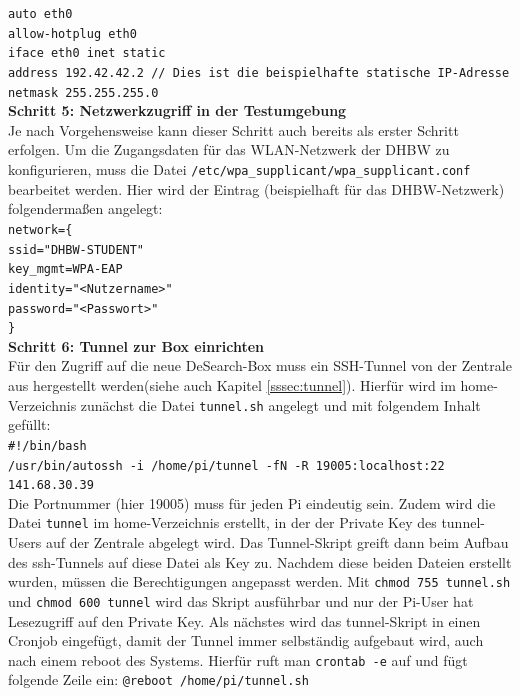 \texttt{auto eth0\\
	allow-hotplug eth0\\
	iface eth0 inet static\\
	address 192.42.42.2 // Dies ist die beispielhafte statische IP-Adresse\\
	netmask 255.255.255.0}\\
\textbf{Schritt 5: Netzwerkzugriff in der Testumgebung}\\
Je nach Vorgehensweise kann dieser Schritt auch bereits als erster Schritt erfolgen. Um die Zugangsdaten für das WLAN-Netzwerk der DHBW zu konfigurieren, muss die Datei \texttt{/etc/wpa\_supplicant/wpa\_supplicant.conf} bearbeitet werden. Hier wird der Eintrag (beispielhaft für das DHBW-Netzwerk) folgendermaßen angelegt:\\
\texttt{network=\{\\
	\tab ssid="DHBW-STUDENT"\\
	\tab key\_mgmt=WPA-EAP\\
	\tab identity="<Nutzername>"\\
	\tab password="<Passwort>"\\
	\}}\\
\textbf{Schritt 6: Tunnel zur Box einrichten}\\
Für den Zugriff auf die neue DeSearch-Box muss ein SSH-Tunnel von der Zentrale aus hergestellt werden(siehe auch Kapitel \ref{sssec:tunnel}). Hierfür wird im home-Verzeichnis zunächst die Datei \texttt{tunnel.sh} angelegt und mit folgendem Inhalt gefüllt:\\
\texttt{\#!/bin/bash\\
	/usr/bin/autossh -i /home/pi/tunnel -fN -R 19005:localhost:22 141.68.30.39}\\
Die Portnummer (hier 19005) muss für jeden Pi eindeutig sein.
Zudem wird die Datei \texttt{tunnel} im home-Verzeichnis erstellt, in der der Private Key des tunnel-Users auf der Zentrale abgelegt wird. Das Tunnel-Skript greift dann beim Aufbau des ssh-Tunnels auf diese Datei als Key zu. Nachdem diese beiden Dateien erstellt wurden, müssen die Berechtigungen angepasst werden. Mit \texttt{chmod 755 tunnel.sh} und \texttt{chmod 600 tunnel} wird das Skript ausführbar und nur der Pi-User hat Lesezugriff auf den Private Key. Als nächstes wird das tunnel-Skript in einen Cronjob eingefügt, damit der Tunnel immer selbständig aufgebaut wird, auch nach einem reboot des Systems. Hierfür ruft man \texttt{crontab -e} auf und fügt folgende Zeile ein: \texttt{@reboot /home/pi/tunnel.sh}\\
